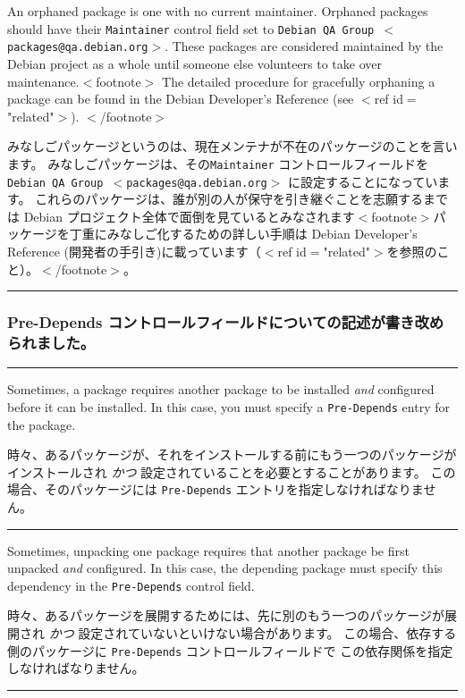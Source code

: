 \documentclass[mingoth,a4paper]{jsarticle}
\begin{document}
\par
\parbox[t]{0.48\linewidth}{
	  An orphaned package is one with no current maintainer.  Orphaned
	  packages should have their {\tt Maintainer} control field set
	  to {\tt Debian QA Group $<$packages@qa.debian.org$>$}.
	  These packages are considered maintained by the Debian project
	  as a whole until someone else volunteers to take over
	  maintenance.$<$footnote$>$
	    The detailed procedure for gracefully orphaning a package can
	    be found in the Debian Developer's Reference
	    (see $<$ref id$=$"related"$>$).
	  $<$/footnote$>$
}\hfil
\parbox[t]{0.48\linewidth}{
	  みなしごパッケージというのは、現在メンテナが不在のパッケージのことを言います。
	  みなしごパッケージは、その{\tt Maintainer} コントロールフィールドを
	   {\tt Debian QA Group $<$packages@qa.debian.org$>$} に設定することになっています。
          これらのパッケージは、誰が別の人が保守を引き継ぐことを志願するまでは
	   Debian プロジェクト全体で面倒を見ているとみなされます$<$footnote$>$パッケージを丁重にみなしご化するための詳しい手順は Debian Developer's Reference (開発者の手引き)に載っています（$<$ref id$=$"related"$>$を参照のこと）。$<$/footnote$>$。
}
\hrule
\vspace{1ex}

\clearpage

\subsubsection{Pre-Depends コントロールフィールドについての記述が書き改められました。}

\vspace*{1ex}
\hrule
{}\par
\parbox[t]{0.48\linewidth}{
	    Sometimes, a package requires another package to be
	    installed {\em and} configured before it can be
	    installed. In this case, you must specify a
	    {\tt Pre-Depends} entry for the package.
            }\hfil
\parbox[t]{0.48\linewidth}{
	    時々、あるパッケージが、それをインストールする前にもう一つのパッケージがインストールされ
	    {\em かつ} 設定されていることを必要とすることがあります。
	    この場合、そのパッケージには
	    {\tt Pre-Depends} エントリを指定しなければなりません。
}
\hrule

\par
\parbox[t]{0.48\linewidth}{
	  Sometimes, unpacking one package requires that another package
	  be first unpacked {\em and} configured.  In this case, the
	  depending package must specify this dependency in
	  the {\tt Pre-Depends} control field.
}\hfil
\parbox[t]{0.48\linewidth}{
	    時々、あるパッケージを展開するためには、先に別のもう一つのパッケージが展開され
	    {\em かつ} 設定されていないといけない場合があります。
	    この場合、依存する側のパッケージに {\tt Pre-Depends} コントロールフィールドで
	    この依存関係を指定しなければなりません。
}
\hrule
\vspace{1ex}
\end{document}
